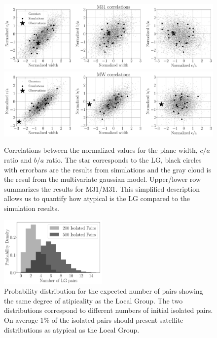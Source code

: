 \documentclass[a4paper,fleqn,usenatbib]{mnras}
\begin{document}
\begin{figure}
\centering
\includegraphics[width=1.0\textwidth]{correlations_M31.pdf}
\includegraphics[width=1.0\textwidth]{correlations_MW.pdf}
\caption{Correlations between the normalized values for the plane
  width, $c/a$ ratio and $b/a$ ratio. 
The star corresponds to the LG, black circles with errorbars are the
results from simulations and the gray cloud is the resul from the
multivariate gaussian model.
Upper/lower row summarizes the results for M31/M31.
This simplified description allows us to quantify how atypical is the
LG compared to the simulation results. 
\label{fig:correlations}}
\end{figure}


\begin{figure}
\centering
\includegraphics[width=0.47\textwidth]{expected_numbers.pdf}
\caption{Probability distribution for the expected number of pairs
  showing the same degree of atipicality as the Local Group. The two
  distributions correspond to different numbers of initial isolated
  pairs. On average $1\%$ of the isolated pairs should present
  satellite distributions as atypical as the Local Group.
\label{fig:expected_number}}
\end{figure}
\end{document}
